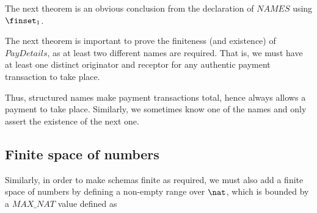 
The next theorem is an obvious conclusion from the declaration of $NAMES$ using $\finset_1$.
%

The next theorem is important to prove the finiteness (and existence)
of $PayDetails$, as at least two different names are required. That is,
we must have at least one distinct originator and receptor for any
authentic payment transaction to take place.
%
%
Thus, structured names make payment transactions total, hence
always allows a payment to take place. Similarly, we sometimes know
one of the names and only assert the existence of the next one.


\subsection{Finite space of numbers}\label{ch3.NAT}

Similarly, in order to make schemas finite as required,
we must also add a finite space of numbers by defining a
non-empty range over $\nat$, which is bounded by a $MAX\_NAT$
value defined as
%
%

